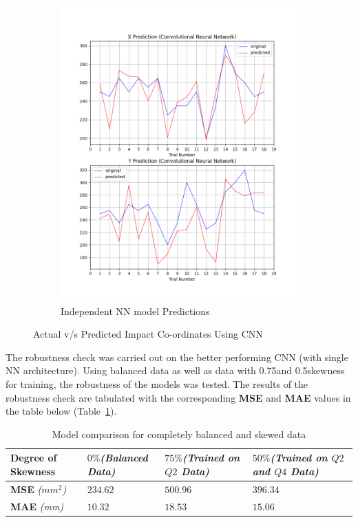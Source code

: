 \documentclass[12pt]{article}
\begin{document}
\begin{figure}[h!]
\begin{subfigure}{0.4\textwidth}
	\includegraphics[scale=0.35]{Images/Double CNN prediction.png}
	\caption{Independent NN model Predictions}
	\label{Two NN model each with one output}
\end{subfigure}
\caption{Actual v/s Predicted Impact Co-ordinates Using CNN}
\label{Actual v/s Predictions Graph}
\end{figure}
\vspace{5ex}

\noindent The robustness check was carried out on the better performing CNN (with single NN architecture). Using balanced data as well as data with 0.75\footnotemark[1] and 0.5\footnotemark[2] skewness for training, the robustness of the models was tested. The results of the robustness check are tabulated with the corresponding \textbf{MSE} and \textbf{MAE} values in the table below (Table~\ref{dataBalancing}).




\begin{table}[h!]
\centering
\begin{tabular}{|m{0.95 in}|m{1.5 in}|m{1.5 in}|m{1.5 in}|}
\hline
\textbf{Degree of Skewness} & \textbf{$0\%$\textit{(Balanced Data)}} & \textbf{$75\%$\textit{(Trained on $Q2$ Data)}} & \textbf{$50\%$\textit{(Trained on $Q2$ and $Q4$ Data)}}\\
\hline
\textbf{MSE} \textit{($mm^2$)} & $234.62$ & $500.96$ &$396.34$\\
\hline
\textbf{MAE} \textit{(mm)} & $10.32$ & $18.53$ &$15.06$\\
\hline
\end{tabular}
\caption{Model comparison for completely balanced and skewed data}
\label{dataBalancing}
\end{table}
\end{document}
